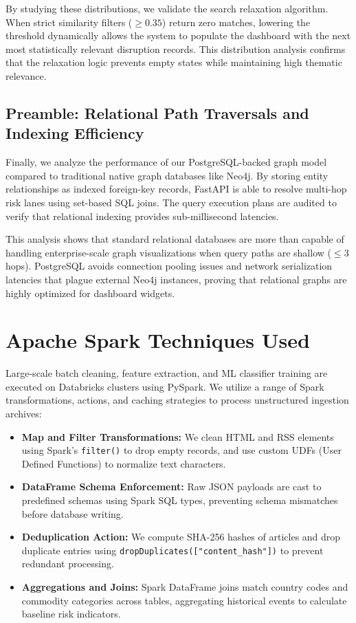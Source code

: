 \documentclass[12pt]{report}
\begin{document}
By studying these distributions, we validate the search relaxation algorithm. When strict similarity filters ($\geq 0.35$) return zero matches, lowering the threshold dynamically allows the system to populate the dashboard with the next most statistically relevant disruption records. This distribution analysis confirms that the relaxation logic prevents empty states while maintaining high thematic relevance.

\newpage
\subsection{Preamble: Relational Path Traversals and Indexing Efficiency}
Finally, we analyze the performance of our PostgreSQL-backed graph model compared to traditional native graph databases like Neo4j. By storing entity relationships as indexed foreign-key records, FastAPI is able to resolve multi-hop risk lanes using set-based SQL joins. The query execution plans are audited to verify that relational indexing provides sub-millisecond latencies.

This analysis shows that standard relational databases are more than capable of handling enterprise-scale graph visualizations when query paths are shallow ($\leq 3$ hops). PostgreSQL avoids connection pooling issues and network serialization latencies that plague external Neo4j instances, proving that relational graphs are highly optimized for dashboard widgets.

\newpage
\section{Apache Spark Techniques Used}
Large-scale batch cleaning, feature extraction, and ML classifier training are executed on Databricks clusters using PySpark. We utilize a range of Spark transformations, actions, and caching strategies to process unstructured ingestion archives:
\begin{itemize}
    \item \textbf{Map and Filter Transformations:} We clean HTML and RSS elements using Spark's \texttt{filter()} to drop empty records, and use custom UDFs (User Defined Functions) to normalize text characters.
    \item \textbf{DataFrame Schema Enforcement:} Raw JSON payloads are cast to predefined schemas using Spark SQL types, preventing schema mismatches before database writing.
    \item \textbf{Deduplication Action:} We compute SHA-256 hashes of articles and drop duplicate entries using \texttt{dropDuplicates(["content\_hash"])} to prevent redundant processing.
    \item \textbf{Aggregations and Joins:} Spark DataFrame joins match country codes and commodity categories across tables, aggregating historical events to calculate baseline risk indicators.
\end{itemize}
\end{document}
